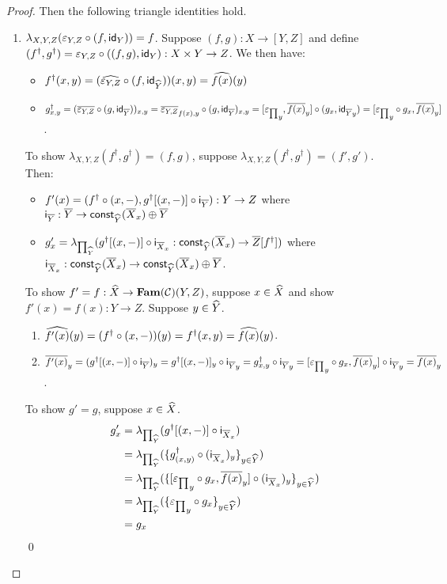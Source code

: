 \begin{proof}
Then the following triangle identities hold.
\begin{enumerate}
\item $\lambda_{X,Y,Z}(\varepsilon_{Y,Z} \circ (f, \mathsf{id}_Y)) = f$. Suppose $(f,g): X \to [Y,Z]$ and define
$(f^\dagger, g^\dagger) = \varepsilon_{Y,Z} \circ ((f,g), \mathsf{id}_Y): X \times Y \to Z$. We then have:
\begin{itemize}
\item $f^\dagger(x,y) = (\widehat{\varepsilon_{Y,Z}} \circ (f, \mathsf{id}_{\widehat{Y}}))(x,y) = \widehat{f(x)}(y)$
\item $g^\dagger_{x,y} = (\overline{\varepsilon_{Y,Z}} \circ (g, \mathsf{id}_{\overline{Y}}))_{x,y} = \overline{\varepsilon_{Y,Z}}_{f(x), y}
\circ (g, \mathsf{id}_{\overline{Y}})_{x,y} = [{\varepsilon_{\prod}}_y, \overline{f(x)}_y] \circ (g_x, {\mathsf{id}_{\overline{Y}}}_y) =
[{\varepsilon_{\prod}}_y \circ g_x, \overline{f(x)}_y]$.
\end{itemize}

To show $\lambda_{X,Y,Z}(f^\dagger, g^\dagger) = (f,g)$, suppose $\lambda_{X,Y,Z}(f^\dagger, g^\dagger) = (f',
g')$. Then:
\begin{itemize}
\item $f'(x) = (f^\dagger \circ (x, -), g^\dagger[(x,-)] \circ \mathsf{i}_{\overline{Y}}): Y \to Z$ where
$\mathsf{i}_{\overline{Y}}: \overline{Y} \to \mathsf{const}_{\widehat{Y}}(\overline{X}_x) \oplus \overline{Y}$
\item $g'_x = \lambda_{\prod_{\widehat{Y}}}(g^\dagger[(x,-)] \circ \mathsf{i}_{\overline{X}_x}:
\mathsf{const}_{\widehat{Y}}(\overline{X}_x) \to \overline{Z}[f^\dagger])$ where $\mathsf{i}_{\overline{X}_x}:
\mathsf{const}_{\widehat{Y}}(\overline{X}_x) \to \mathsf{const}_{\widehat{Y}}(\overline{X}_x) \oplus \overline{Y}$.
\end{itemize}
\noindent To show $f' = f : \widehat{X} \to \mathbf{Fam}(\mathcal{C})(Y,Z)$, suppose $x \in \widehat{X}$ and show $f'(x) = f(x): Y
\to Z$. Suppose $y \in \widehat{Y}$.
\begin{enumerate}
\item $\widehat{f'(x)}(y) = (f^\dagger \circ (x, -))(y) = f^\dagger(x,y) = \widehat{f(x)}(y)$.
\item $\overline{f'(x)}_y = (g^\dagger[(x,-)] \circ \mathsf{i}_{\overline{Y}})_y = g^\dagger[(x,-)]_y \circ
{\mathsf{i}_{\overline{Y}}}_y = g^\dagger_{x,y} \circ {\mathsf{i}_{\overline{Y}}}_y = [{\varepsilon_{\prod}}_y \circ
g_x, \overline{f(x)}_y] \circ {\mathsf{i}_{\overline{Y}}}_y = \overline{f(x)}_y$.
\end{enumerate}

To show $g' = g$, suppose $x \in \widehat{X}$.
\begin{align*}
\small
g'_x
&=
\lambda_{\prod_{\widehat{Y}}}(g^\dagger[(x,-)] \circ \mathsf{i}_{\overline{X}_x}) \\
&=
\lambda_{\prod_{\widehat{Y}}}(\{g^\dagger_{(x,y)} \circ (\mathsf{i}_{\overline{X}_x})_y\}_{y \in \widehat{Y}}) \\
&=
\lambda_{\prod_{\widehat{Y}}}(\{[{\varepsilon_{\prod}}_y \circ g_x, \overline{f(x)}_y] \circ (\mathsf{i}_{\overline{X}_x})_y\}_{y \in \widehat{Y}}) \\
&=
\lambda_{\prod_{\widehat{Y}}}(\{{\varepsilon_{\prod}}_y \circ g_x\}_{y \in \widehat{Y}}) \\
&=
g_x
\end{align*}
\qed


\end{enumerate}
\end{proof}
